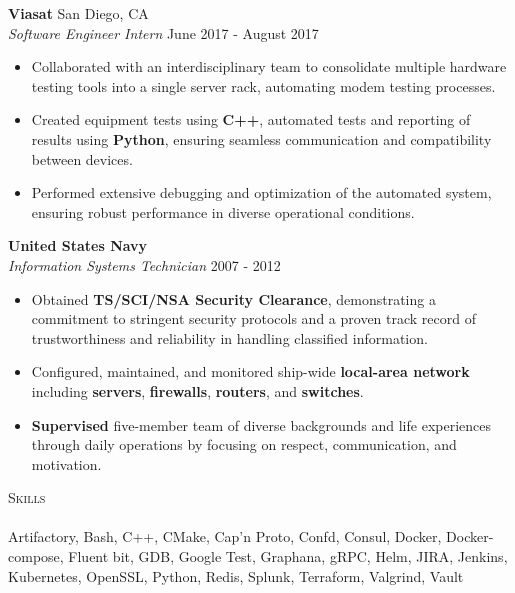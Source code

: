\documentclass[a4paper]{article}
\newcommand{\lineunder} {
    \vspace*{-8pt} \\
    \hspace*{-18pt} \hrulefill \\
}
\newcommand{\header} [1] {
    {\hspace*{-18pt}\vspace*{6pt} \textsc{#1}}
    \vspace*{-6pt} \lineunder
}
\begin{document}
\vspace{-1mm}
\textbf{Viasat} \hfill San Diego, CA\\
\textit{Software Engineer Intern} \hfill June 2017 - August 2017\\
\vspace{-1mm}
\begin{itemize} \itemsep 1pt
    \item Collaborated with an interdisciplinary team to consolidate multiple hardware testing tools into a single server rack, automating modem testing processes.
    \item Created equipment tests using \textbf{C++}, automated tests and reporting of results using \textbf{Python}, ensuring seamless communication and compatibility between devices.
    \item Performed extensive debugging and optimization of the automated system, ensuring robust performance in diverse operational conditions.
\end{itemize}

\textbf{United States Navy} \hfill \\
\textit{Information Systems Technician} \hfill 2007 - 2012\\
\vspace{-1mm}
\begin{itemize} \itemsep 1pt
	\item Obtained \textbf{TS/SCI/NSA Security Clearance}, demonstrating a commitment to stringent security protocols and a proven track record of trustworthiness and reliability in handling classified information.
	\item Configured, maintained, and monitored ship-wide \textbf{local-area network} including \textbf{servers}, \textbf{firewalls}, \textbf{routers}, and \textbf{switches}.
	\item \textbf{Supervised} five-member team of diverse backgrounds and life experiences through daily operations by focusing on respect, communication, and motivation.
\end{itemize}

\header{Skills}
Artifactory, Bash, C++, CMake, Cap'n Proto, Confd, Consul, Docker, Docker-compose, Fluent bit, GDB, Google Test, Graphana, gRPC, Helm, JIRA, Jenkins, Kubernetes, OpenSSL, Python, Redis, Splunk, Terraform, Valgrind, Vault
\\
\vspace{2mm}
\end{document}
